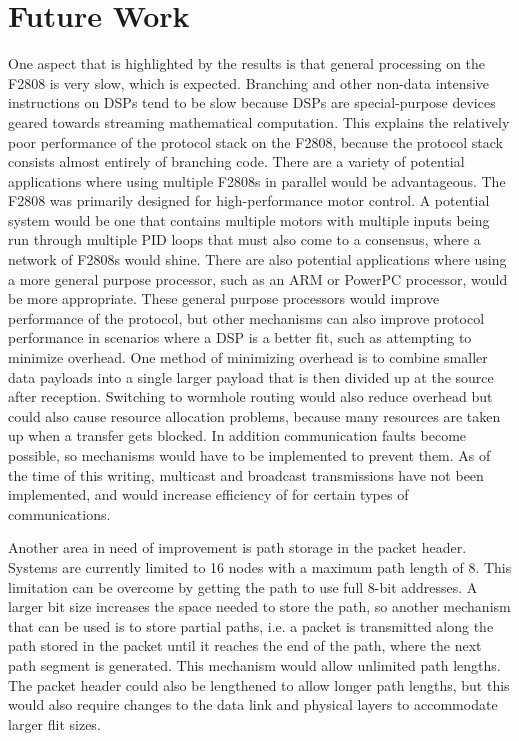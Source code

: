 \section{Future Work}\label{sec:protocol:future_work}

One aspect that is highlighted by the results is that general processing on the F2808 is very slow, which is expected. Branching and other non-data intensive instructions on DSPs tend to be slow because DSPs are special-purpose devices geared towards streaming mathematical computation. This explains the relatively poor performance of the protocol stack on the F2808, because the protocol stack consists almost entirely of branching code. There are a variety of potential applications where using multiple F2808s in parallel would be advantageous. The F2808 was primarily designed for high-performance motor control. A potential system would be one that contains multiple motors with multiple inputs being run through multiple PID loops that must also come to a consensus, where a network of F2808s would shine. There are also potential applications where using a more general purpose processor, such as an ARM or PowerPC processor, would be more appropriate. These general purpose processors would improve performance of the protocol, but other mechanisms can also improve protocol performance in scenarios where a DSP is a better fit, such as attempting to minimize overhead. One method of minimizing overhead is to combine smaller data payloads into a single larger payload that is then divided up at the source after reception. Switching to wormhole routing would also reduce overhead but could also cause resource allocation problems, because many resources are taken up when a transfer gets blocked. In addition communication faults become possible, so mechanisms would have to be implemented to prevent them. As of the time of this writing, multicast and broadcast transmissions have not been implemented, and would increase efficiency of for certain types of communications.

Another area in need of improvement is path storage in the packet header. Systems are currently limited to 16 nodes with a maximum path length of 8. This limitation can be overcome by getting the path to use full 8-bit addresses. A larger bit size increases the space needed to store the path, so another mechanism that can be used is to store partial paths, i.e. a packet is transmitted along the path stored in the packet until it reaches the end of the path, where the next path segment is generated. This mechanism would allow unlimited path lengths. The packet header could also be lengthened to allow longer path lengths, but this would also require changes to the data link and physical layers to accommodate larger flit sizes.

